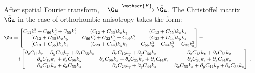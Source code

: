 After spatial Fourier transform, $-\Ga \xrightarrow{\mathscr{F}} \tilde{\Ga}$. The Christoffel matrix $\tilde{\Ga}$ in the case of orthorhombic anisotropy takes the form:
\begin{eqnarray}
  \tilde{\Ga} 
  &=
  \begin{bmatrix}
    C_{11}k_x^2+C_{66}k_y^2+C_{55}k_z^2 & (C_{12}+C_{66})k_xk_y & (C_{13}+C_{55})k_xk_z \\
    (C_{12}+C_{66})k_xk_y & C_{66}k_x^2+C_{22}k_y^2+C_{44}k_z^2 & (C_{23}+C_{44})k_yk_z  \\
    (C_{13}+C_{55})k_xk_z & (C_{23}+C_{44})k_yk_z & C_{55}k_x^2+C_{44}k_y^2+C_{33}k_z^2
  \end{bmatrix} - \\ \nonumber
  &\ \hphantom{=} i
  \begin{bmatrix}
      \partial_xC_{11}k_x+\partial_yC_{66}k_y+\partial_zC_{55}k_z & \partial_xC_{12}k_y+\partial_yC_{66}k_x & \partial_xC_{13}k_z+\partial_zC_{55}k_x \\
      \partial_yC_{12}k_x+\partial_xC_{66}k_y & \partial_xC_{66}k_x+\partial_yC_{22}k_y+\partial_zC_{44}k_z & \partial_yC_{23}k_z+\partial_zC_{44}k_y \\
      \partial_zC_{13}k_x+\partial_xC_{55}k_z & \partial_zC_{23}k_y+\partial_yC_{44}k_z & \partial_xC_{55}k_x+\partial_yC_{44}k_y+\partial_zC_{33}k_z
  \end{bmatrix}
  \;. 
\end{eqnarray}


